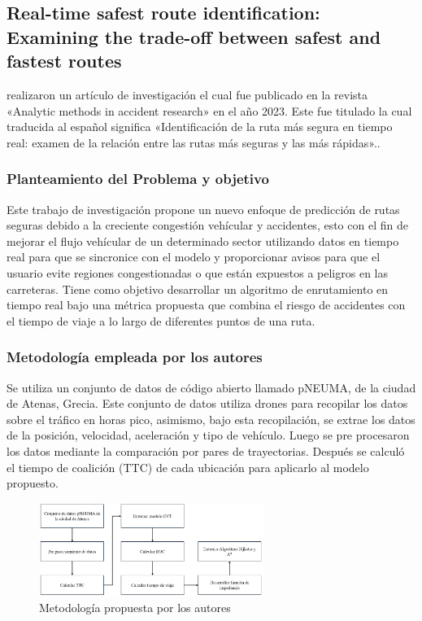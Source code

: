 \subsection{Real-time safest route identification: Examining the trade-off between safest and fastest routes \citep*{pr_dehghani2018copper}}
\citeauthor{pr_dehghani2018copper} realizaron un artículo de investigación el cual fue publicado en la revista «Analytic methods in accident research» en el año 2023. Este fue titulado  la cual traducida al español significa «Identificación de la ruta más segura en tiempo real: examen de la relación entre las rutas más seguras y las más rápidas»..

\subsubsection{Planteamiento del Problema y objetivo }
Este trabajo de investigación propone un nuevo enfoque de predicción de rutas seguras debido a la creciente congestión vehícular y accidentes, esto con el fin de mejorar el flujo vehícular  de un determinado sector utilizando datos en tiempo real para que se sincronice con el modelo y proporcionar avisos para que el usuario evite regiones congestionadas o que están expuestos a peligros en las carreteras. Tiene como objetivo desarrollar un algoritmo de enrutamiento en tiempo real bajo una métrica propuesta que combina el riesgo de accidentes con el tiempo de viaje a lo largo de diferentes puntos de una ruta.

\subsubsection{Metodología empleada por los autores}
Se utiliza un conjunto de datos de código abierto llamado pNEUMA, de la ciudad de Atenas, Grecia. Este conjunto de datos utiliza drones para recopilar los datos sobre el tráfico en horas pico, asimismo, bajo esta recopilación, se extrae los datos de la posición, velocidad, aceleración y tipo de vehículo. Luego se pre procesaron los datos mediante la comparación por pares de trayectorias. Después se calculó el tiempo de coalición (TTC) de cada ubicación para aplicarlo al modelo propuesto.
\begin{figure}[h]
	\begin{center}
		\includegraphics[width=0.65\textwidth]{2/figures/AtenaMetodo.jpg}
		\caption{Metodología propuesta por los autores}
		\label{1:fig2}
	\end{center}
\end{figure}

